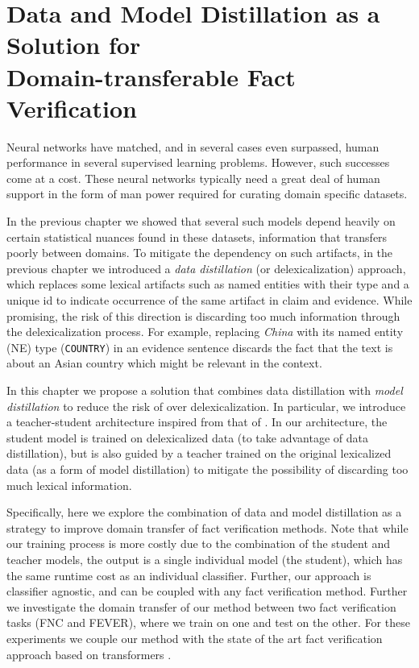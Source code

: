 
\chapter{Data and Model Distillation as a Solution for\\Domain-transferable Fact Verification \label{chapter:naacl21}}

Neural networks have matched, and in several cases even surpassed, human performance in several supervised learning problems. However, such successes come at a cost. These neural networks typically need a great deal of human support in the form of man power required for curating domain specific datasets. 

In the previous chapter we showed that several such models depend heavily on certain statistical nuances found in these datasets, information that transfers poorly between domains. To mitigate the dependency on such artifacts, in the previous chapter we introduced  a {\em data distillation} (or delexicalization) approach, which replaces some lexical artifacts such as named entities with their type and a unique id to indicate occurrence of the same artifact in claim and evidence. While promising, the risk of this direction is discarding too much information through the delexicalization process. For example, replacing {\em China} with its named entity (NE) type ({\tt COUNTRY}) in an evidence sentence discards the fact that the text is about an Asian country which might be relevant in the context.

In this chapter we propose a solution that combines data distillation with {\em model distillation} to reduce the risk of over delexicalization. In particular, we introduce a teacher-student architecture inspired from that of \cite{tarvainen2017mean}. In our architecture, the student model is trained on delexicalized data (to take advantage of data distillation), but is also guided by a teacher trained on the original lexicalized data (as a form of model distillation) to mitigate the possibility of discarding too much lexical information. 

Specifically, here we explore the combination of data and model distillation as a strategy to improve domain transfer of fact verification methods. Note that while our training process is more costly due to the combination of the student and teacher models, the output is a single individual model (the student), which has the same runtime cost as an individual classifier. Further, our approach is classifier agnostic, and can be coupled with any fact verification method.
Further we investigate the domain transfer of our method between two fact verification tasks (FNC and FEVER), where we train on one and test on the other. For these experiments we couple our method with the state of the art fact verification approach based on transformers \citep{vaswani2017attention}. 

